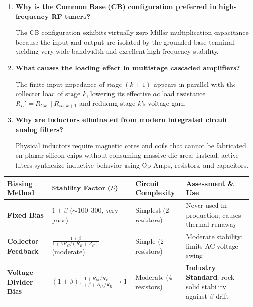 \documentclass[12pt,a4paper]{article}
\newcommand{\Q}[1]{\textbf{#1}\par\noindent\ignorespaces}
\renewcommand{\arraystretch}{1.45}
\begin{document}
\begin{tcolorbox}[exambox, title={Frequently Asked / Viva Questions}]
\begin{enumerate}[topsep=0pt, label=\textbf{Q\arabic*.}, itemsep=5pt]
  \item \Q{Why is the Common Base (CB) configuration preferred in high-frequency RF tuners?}
  The CB configuration exhibits virtually zero Miller multiplication capacitance because the input and output are isolated by the grounded base terminal, yielding very wide bandwidth and excellent high-frequency stability.

  \item \Q{What causes the loading effect in multistage cascaded amplifiers?}
  The finite input impedance of stage $(k+1)$ appears in parallel with the collector load of stage $k$, lowering its effective $ac$ load resistance $R_L' = R_{Ck} \parallel R_{in,k+1}$ and reducing stage $k$'s voltage gain.

  \item \Q{Why are inductors eliminated from modern integrated circuit analog filters?}
  Physical inductors require magnetic cores and coils that cannot be fabricated on planar silicon chips without consuming massive die area; instead, active filters synthesize inductive behavior using Op-Amps, resistors, and capacitors.
\end{enumerate}
\end{tcolorbox}

\begin{tcolorbox}[tikzbox, title={Summary Comparison of BJT Biasing Methods}]
\renewcommand{\arraystretch}{1.25}
\setlength{\tabcolsep}{5pt}
\noindent\begin{tabularx}{\linewidth}{|B{3.2cm}|Y|Y|Y|}
\hline
\textbf{Biasing Method} & \textbf{Stability Factor ($S$)} & \textbf{Circuit Complexity} & \textbf{Assessment \& Use} \\
\hline
\textbf{Fixed Bias} & $1+\beta$ ($\sim 100$--$300$, very poor) & Simplest (2 resistors) & Never used in production; causes thermal runaway \\
\hline
\textbf{Collector Feedback}& $\frac{1+\beta}{1+\beta R_C/(R_B+R_C)}$ (moderate) & Simple (2 resistors) & Moderate stability; limits AC voltage swing \\
\hline
\textbf{Voltage Divider Bias}& $(1+\beta)\frac{1+R_{th}/R_E}{1+\beta+R_{th}/R_E} \to 1$ & Moderate (4 resistors) & \textbf{Industry Standard}; rock-solid stability against $\beta$ drift \\
\hline
\end{tabularx}\par
\end{tcolorbox}
\end{document}
